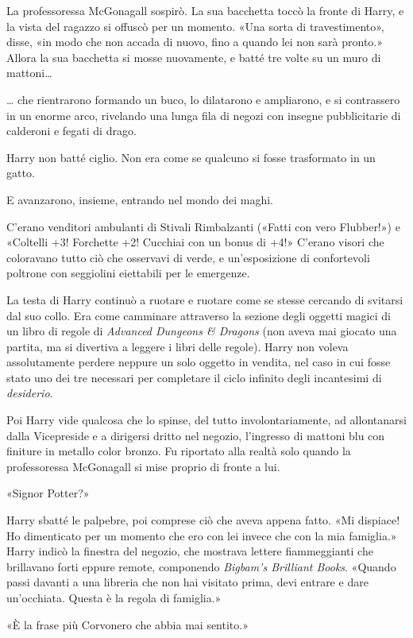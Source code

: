La professoressa McGonagall sospirò. La sua bacchetta toccò la fronte di Harry, e la vista del ragazzo si offuscò per un momento. «Una sorta di travestimento», disse, «in modo che non accada di nuovo, fino a quando lei non sarà pronto.» Allora la sua bacchetta si mosse nuovamente, e batté tre volte su un muro di mattoni…

… che rientrarono formando un buco, lo dilatarono e ampliarono, e si contrassero in un enorme arco, rivelando una lunga fila di negozi con insegne pubblicitarie di calderoni e fegati di drago.

Harry non batté ciglio. Non era come se qualcuno si fosse trasformato in un gatto.

E avanzarono, insieme, entrando nel mondo dei maghi.

C’erano venditori ambulanti di Stivali Rimbalzanti («Fatti con vero Flubber!») e «Coltelli +3! Forchette +2! Cucchiai con un bonus di +4!» C’erano visori che coloravano tutto ciò che osservavi di verde, e un’esposizione di confortevoli poltrone con seggiolini eiettabili per le emergenze.

La testa di Harry continuò a ruotare e ruotare come se stesse cercando di svitarsi dal suo collo. Era come camminare attraverso la sezione degli oggetti magici di un libro di regole di \textit{Advanced Dungeons \& Dragons} (non aveva mai giocato una partita, ma si divertiva a leggere i libri delle regole). Harry non voleva assolutamente perdere neppure un solo oggetto in vendita, nel caso in cui fosse stato uno dei tre necessari per completare il ciclo infinito degli incantesimi di \textit{desiderio}.

Poi Harry vide qualcosa che lo spinse, del tutto involontariamente, ad allontanarsi dalla Vicepreside e a dirigersi dritto nel negozio, l’ingresso di mattoni blu con finiture in metallo color bronzo. Fu riportato alla realtà solo quando la professoressa McGonagall si mise proprio di fronte a lui.

«Signor Potter?»

Harry sbatté le palpebre, poi comprese ciò che aveva appena fatto. «Mi dispiace! Ho dimenticato per un momento che ero con lei invece che con la mia famiglia.» Harry indicò la finestra del negozio, che mostrava lettere fiammeggianti che brillavano forti eppure remote, componendo \textit{Bigbam’s Brilliant Books}. «Quando passi davanti a una libreria che non hai visitato prima, devi entrare e dare un’occhiata. Questa è la regola di famiglia.»

«È la frase più Corvonero che abbia mai sentito.»

